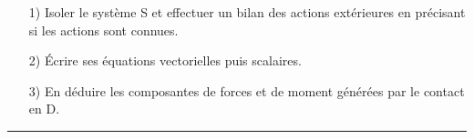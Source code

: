 \documentclass[a4paper,12pt]{article}
\begin{document}
\begin{itemize}
\item[1)] Isoler le système S et effectuer un bilan des actions extérieures en précisant si les actions sont connues.\vspace{1mm}
\item[2)] Écrire ses équations vectorielles puis scalaires.\vspace{1mm}
\item[3)] En déduire les composantes de forces et de moment générées par le contact en D.  \vspace{2mm}
\end{itemize}
\hrule
\end{document}
